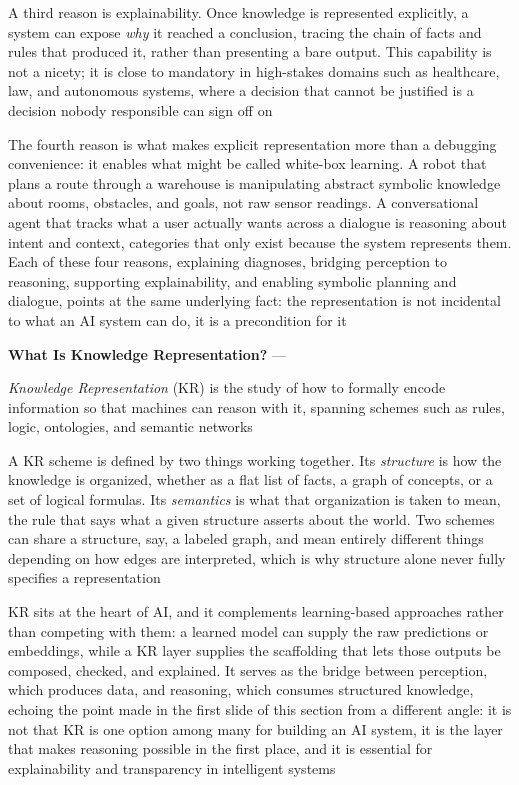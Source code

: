 A third reason is explainability. Once knowledge is represented explicitly,
a system can expose \emph{why} it reached a conclusion, tracing the chain of
facts and rules that produced it, rather than presenting a bare output. This
capability is not a nicety; it is close to mandatory in high-stakes domains
such as healthcare, law, and autonomous systems, where a decision that
cannot be justified is a decision nobody responsible can sign off on

The fourth reason is what makes explicit representation more than a
debugging convenience: it enables what might be called white-box learning.
A robot that plans a route through a warehouse is manipulating abstract
symbolic knowledge about rooms, obstacles, and goals, not raw sensor
readings. A conversational agent that tracks what a user actually wants
across a dialogue is reasoning about intent and context, categories that
only exist because the system represents them. Each of these four
reasons, explaining diagnoses, bridging perception to reasoning,
supporting explainability, and enabling symbolic planning and dialogue,
points at the same underlying fact: the representation is not incidental to
what an AI system can do, it is a precondition for it

\textbf{What Is Knowledge Representation?} --- \begin{definition}
  \emph{Knowledge Representation} (KR) is the study of how to formally encode
  information so that machines can reason with it, spanning schemes such as
  rules, logic, ontologies, and semantic networks
\end{definition}
A KR scheme is defined by two things working together. Its \emph{structure}
is how the knowledge is organized, whether as a flat list of facts, a graph
of concepts, or a set of logical formulas. Its \emph{semantics} is what that
organization is taken to mean, the rule that says what a given structure
asserts about the world. Two schemes can share a structure, say, a labeled
graph, and mean entirely different things depending on how edges are
interpreted, which is why structure alone never fully specifies a
representation

KR sits at the heart of AI, and it complements learning-based approaches
rather than competing with them: a learned model can supply the raw
predictions or embeddings, while a KR layer supplies the scaffolding that
lets those outputs be composed, checked, and explained. It serves as the
bridge between perception, which produces data, and reasoning, which
consumes structured knowledge, echoing the point made in the first slide of
this section from a different angle: it is not that KR is one option among
many for building an AI system, it is the layer that makes reasoning
possible in the first place, and it is essential for explainability and
transparency in intelligent systems

